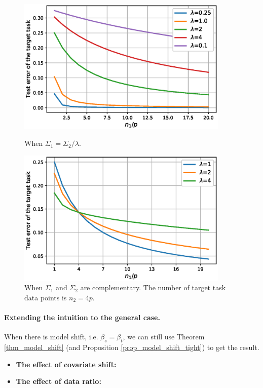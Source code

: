\begin{figure}
	\centering
	\begin{minipage}{0.48\textwidth}
		\centering
		\includegraphics[width=0.9\textwidth]{figures/scaling.eps}
		\caption{When $\Sigma_1 = \Sigma_2 / \lambda$.}
		\label{fig_te_scaling}
	\end{minipage}\hfill
	\begin{minipage}{0.48\textwidth}
		\centering
		\includegraphics[width=0.9\textwidth]{figures/complementary.eps}
		\caption{When $\Sigma_1$ and $\Sigma_2$ are complementary. The number of target task data points is $n_2 = 4p$.}
		\label{fig_te_complement}
	\end{minipage}
\end{figure}


\paragraph{Extending the intuition to the general case.}
When there is model shift, i.e. $\beta_s = \beta_t$, we can still use Theorem \ref{thm_model_shift} (and Proposition \ref{prop_model_shift_tight}) to get the result.
\begin{itemize}
	\item \textbf{The effect of covariate shift:}
	\item \textbf{The effect of data ratio:}
\end{itemize}

